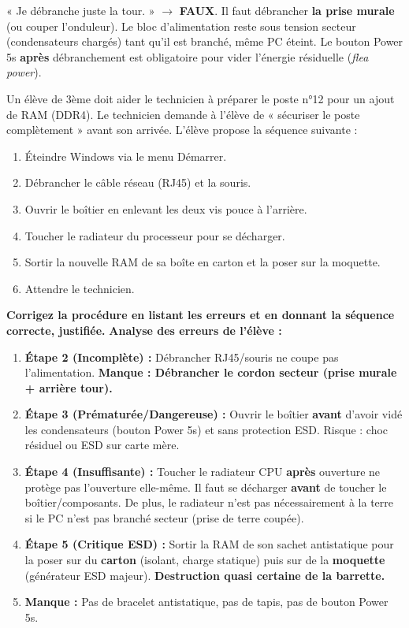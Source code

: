 \documentclass[11pt]{article}
\begin{document}
\begin{attention}
    « Je débranche juste la tour. » $\rightarrow$ \textbf{FAUX}. Il faut débrancher \textbf{la prise murale} (ou couper l'onduleur). Le bloc d'alimentation reste sous tension secteur (condensateurs chargés) tant qu'il est branché, même PC éteint. Le bouton Power 5s \textbf{après} débranchement est obligatoire pour vider l'énergie résiduelle (\emph{flea power}).
\end{attention}

\begin{exoresolu}
Un élève de 3ème doit aider le technicien à préparer le poste n°12 pour un ajout de RAM (DDR4). Le technicien demande à l'élève de « sécuriser le poste complètement » avant son arrivée. L'élève propose la séquence suivante :
\begin{enumerate}
    \item Éteindre Windows via le menu Démarrer.
    \item Débrancher le câble réseau (RJ45) et la souris.
    \item Ouvrir le boîtier en enlevant les deux vis pouce à l'arrière.
    \item Toucher le radiateur du processeur pour se décharger.
    \item Sortir la nouvelle RAM de sa boîte en carton et la poser sur la moquette.
    \item Attendre le technicien.
\end{enumerate}
\textbf{Corrigez la procédure en listant les erreurs et en donnant la séquence correcte, justifiée.}
\tcblower
\textbf{Analyse des erreurs de l'élève :}
\begin{enumerate}
    \item \textbf{Étape 2 (Incomplète) :} Débrancher RJ45/souris ne coupe pas l'alimentation. \textbf{Manque : Débrancher le cordon secteur (prise murale + arrière tour).}
    \item \textbf{Étape 3 (Prématurée/Dangereuse) :} Ouvrir le boîtier \textbf{avant} d'avoir vidé les condensateurs (bouton Power 5s) et sans protection ESD. Risque : choc résiduel ou ESD sur carte mère.
    \item \textbf{Étape 4 (Insuffisante) :} Toucher le radiateur CPU \textbf{après} ouverture ne protège pas l'ouverture elle-même. Il faut se décharger \textbf{avant} de toucher le boîtier/composants. De plus, le radiateur n'est pas nécessairement à la terre si le PC n'est pas branché secteur (prise de terre coupée).
    \item \textbf{Étape 5 (Critique ESD) :} Sortir la RAM de son sachet antistatique pour la poser sur du \textbf{carton} (isolant, charge statique) puis sur de la \textbf{moquette} (générateur ESD majeur). \textbf{Destruction quasi certaine de la barrette.}
    \item \textbf{Manque :} Pas de bracelet antistatique, pas de tapis, pas de bouton Power 5s.
\end{enumerate}


\end{exoresolu}
\end{document}
